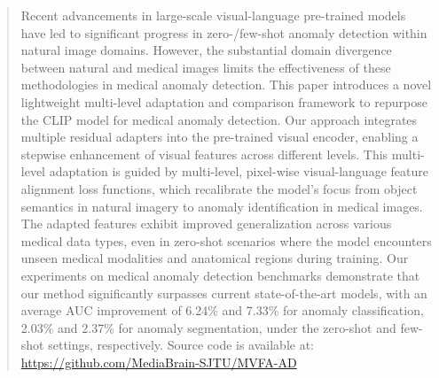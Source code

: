\begin{abstract}
Recent advancements in large-scale visual-language pre-trained models have led to significant progress in zero-/few-shot anomaly detection within natural image domains. However, the substantial domain divergence between natural and medical images limits the effectiveness of these methodologies in medical anomaly detection. This paper introduces a novel lightweight multi-level adaptation and comparison framework to repurpose the CLIP model for medical anomaly detection. Our approach integrates multiple residual adapters into the pre-trained visual encoder, enabling a stepwise enhancement of visual features across different levels. This multi-level adaptation is guided by multi-level, pixel-wise visual-language feature alignment loss functions, which recalibrate the model’s focus from object semantics in natural imagery to anomaly identification in medical images. The adapted features exhibit improved generalization across various medical data types, even in zero-shot scenarios where the model encounters unseen medical modalities and anatomical regions during training. Our experiments on medical anomaly detection benchmarks demonstrate that our method significantly surpasses current state-of-the-art models, with an average AUC improvement of 6.24\% and 7.33\% for anomaly classification, 2.03\% and 2.37\% for anomaly segmentation, under the zero-shot and few-shot settings, respectively. Source code is available at: \url{https://github.com/MediaBrain-SJTU/MVFA-AD}
\end{abstract}